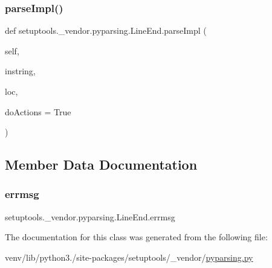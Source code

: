 \subsubsection{\texorpdfstring{parse\+Impl()}{parseImpl()}}
{\footnotesize\ttfamily def setuptools.\+\_\+vendor.\+pyparsing.\+Line\+End.\+parse\+Impl (\begin{DoxyParamCaption}\item[{}]{self,  }\item[{}]{instring,  }\item[{}]{loc,  }\item[{}]{do\+Actions = {\ttfamily True} }\end{DoxyParamCaption})}



\subsection{Member Data Documentation}
\mbox{\label{classsetuptools_1_1__vendor_1_1pyparsing_1_1LineEnd_a17e435f83fa54c889ae9082c86e23280}} 
\subsubsection{\texorpdfstring{errmsg}{errmsg}}
{\footnotesize\ttfamily setuptools.\+\_\+vendor.\+pyparsing.\+Line\+End.\+errmsg}



The documentation for this class was generated from the following file\+:\begin{DoxyCompactItemize}
\item 
venv/lib/python3./site-\/packages/setuptools/\+\_\+vendor/\hyperlink{setuptools_2__vendor_2pyparsing_8py}{pyparsing.\+py}\end{DoxyCompactItemize}
